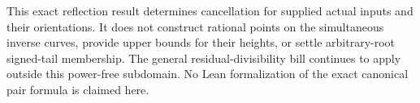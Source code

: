 This exact reflection result determines cancellation for supplied
actual inputs and their orientations. It does not construct rational
points on the simultaneous inverse curves, provide upper bounds for
their heights, or settle arbitrary-root signed-tail membership. The
general residual-divisibility bill continues to apply outside this
power-free subdomain. No Lean formalization of the exact canonical
pair formula is claimed here.
